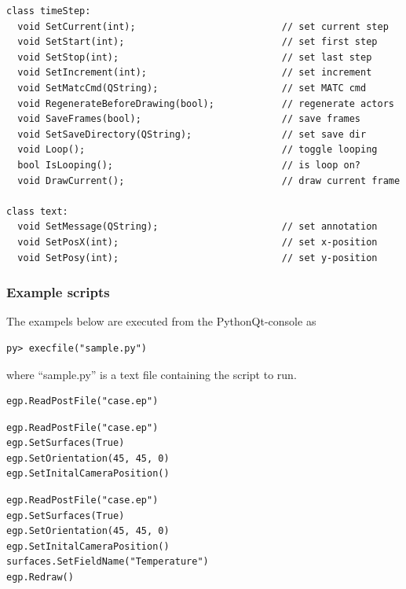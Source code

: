 \documentclass[a4paper,12pt]{article}
\begin{document}
\begin{footnotesize}
\begin{verbatim}
class timeStep:
  void SetCurrent(int);                          // set current step
  void SetStart(int);                            // set first step
  void SetStop(int);                             // set last step
  void SetIncrement(int);                        // set increment
  void SetMatcCmd(QString);                      // set MATC cmd
  void RegenerateBeforeDrawing(bool);            // regenerate actors
  void SaveFrames(bool);                         // save frames
  void SetSaveDirectory(QString);                // set save dir
  void Loop();                                   // toggle looping
  bool IsLooping();                              // is loop on?
  void DrawCurrent();                            // draw current frame

class text:
  void SetMessage(QString);                      // set annotation
  void SetPosX(int);                             // set x-position
  void SetPosy(int);                             // set y-position
\end{verbatim}
\end{footnotesize}

\subsubsection{Example scripts}

The exampels below are executed from the PythonQt-console as
\begin{footnotesize}
\begin{verbatim}
py> execfile("sample.py")
\end{verbatim}
\end{footnotesize}
where ``sample.py'' is a text file containing the script to run.

\vskip5mm
\begin{footnotesize}
\begin{verbatim}
egp.ReadPostFile("case.ep")
\end{verbatim}
\end{footnotesize}

\vskip5mm
\begin{footnotesize}
\begin{verbatim}
egp.ReadPostFile("case.ep")
egp.SetSurfaces(True)
egp.SetOrientation(45, 45, 0)
egp.SetInitalCameraPosition()
\end{verbatim}
\end{footnotesize}

\vskip5mm
\begin{footnotesize}
\begin{verbatim}
egp.ReadPostFile("case.ep")
egp.SetSurfaces(True)
egp.SetOrientation(45, 45, 0)
egp.SetInitalCameraPosition()
surfaces.SetFieldName("Temperature")
egp.Redraw()
\end{verbatim}
\end{footnotesize}
\end{document}
